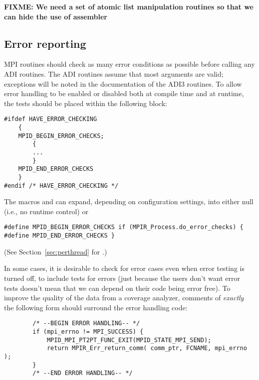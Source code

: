 \documentclass{article}
\def\fixme#1{\marginpar{FIXME:}\textbf{FIXME: #1}}
\begin{document}
\fixme{We need a set of atomic list manipulation routines so that we
  can hide the use of assembler}

\subsection{Error reporting}
\label{sec:error-reporting}

MPI routines should check as many error conditions as possible before
calling any ADI routines.  The ADI routines assume that most arguments are
valid; exceptions will be noted in the documentation of the ADI3 routines.
To allow error handling to be enabled or disabled both at compile
time 
and at runtime, the tests should be placed within the following block:
\begin{verbatim}
#ifdef HAVE_ERROR_CHECKING
    {
    MPID_BEGIN_ERROR_CHECKS;
        {
        ...
        }
    MPID_END_ERROR_CHECKS
    }
#endif /* HAVE_ERROR_CHECKING */
\end{verbatim}
The macros  and  can
expand, depending on configuration settings, into either null (i.e.,
no runtime control) or 
\begin{verbatim}
#define MPID_BEGIN_ERROR_CHECKS if (MPIR_Process.do_error_checks) {
#define MPID_END_ERROR_CHECKS }
\end{verbatim}
(See Section~\ref{sec:perthread} for .)

In some cases, it is desirable to check for error cases even when
error testing is turned off, to include tests for errors (just because
the users don't want error tests doesn't mean that we can depend on
their code being error free).  To improve the quality of the data from
a coverage analyzer, comments of \emph{exactly} the following form
should surround the error handling code:
\begin{verbatim}
        /* --BEGIN ERROR HANDLING-- */
        if (mpi_errno != MPI_SUCCESS) {
            MPID_MPI_PT2PT_FUNC_EXIT(MPID_STATE_MPI_SEND);
            return MPIR_Err_return_comm( comm_ptr, FCNAME, mpi_errno );
        }     
        /* --END ERROR HANDLING-- */
\end{verbatim}

\end{document}
